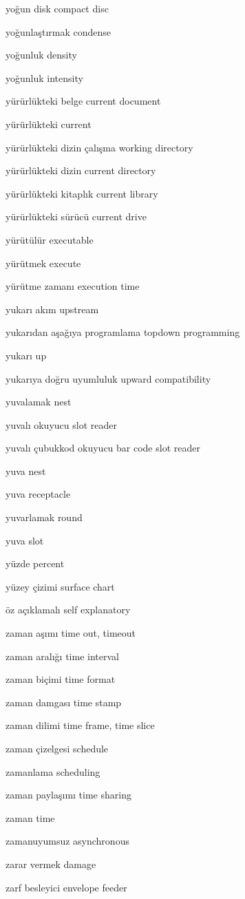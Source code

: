 \documentclass[12pt,fleqn]{article}\usepackage{../../common}
\begin{document}
yoğun disk compact disc

yoğunlaştırmak condense

yoğunluk density

yoğunluk intensity

yürürlükteki belge current document

yürürlükteki current

yürürlükteki dizin çalışma working directory

yürürlükteki dizin current directory

yürürlükteki kitaplık current library

yürürlükteki sürücü current drive

yürütülür executable

yürütmek execute

yürütme zamanı execution time

yukarı akım upstream

yukarıdan aşağıya programlama topdown programming

yukarı up

yukarıya doğru uyumluluk upward compatibility

yuvalamak nest

yuvalı okuyucu slot reader

yuvalı çubukkod okuyucu bar code slot reader

yuva nest

yuva receptacle

yuvarlamak round

yuva slot

yüzde percent

yüzey çizimi surface chart

öz açıklamalı self explanatory

zaman aşımı time out, timeout

zaman aralığı time interval

zaman biçimi time format

zaman damgası time stamp

zaman dilimi time frame, time slice

zaman çizelgesi schedule

zamanlama scheduling

zaman paylaşımı time sharing

zaman time

zamanuyumsuz asynchronous

zarar vermek damage

zarf besleyici envelope feeder
\end{document}
